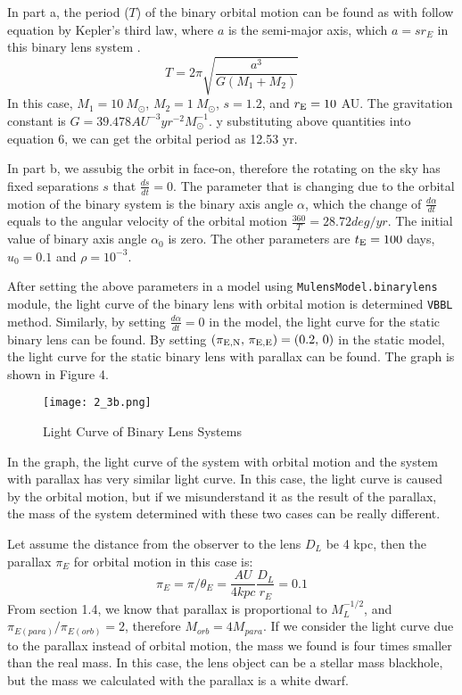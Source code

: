 \documentclass[preprint]{aastex63}
\begin{document}
In part a, the period ($T$) of the binary orbital motion can be found as with follow equation by Kepler's third law, where $a$ is the semi-major axis, which $a=sr_E$ in this binary lens system \cite{Carroll2007_2}.
\begin{equation}
   T = 2\pi\sqrt{\frac{a^3}{G (M_1 + M_2)}}
\end{equation}
In this case, $M_1=10~M_\odot$, $M_2=1~M_\odot$, $s=1.2$, and $r_{\rm E}=10$ AU. The gravitation constant is $G=39.478 AU^{-3}yr^{-2}M_\odot^{-1}$. y substituting above quantities into equation 6, we can get the orbital period as 12.53 yr.\par
\bigskip
In part b, we assubig the orbit in face-on, therefore the rotating on the sky has fixed separations $s$ that $\frac{ds}{dt}=0$. The parameter that is changing due to the orbital motion of the binary system is the binary axis angle $\alpha$, which the change of $\frac{d\alpha}{dt}$ equals to the angular velocity of the orbital motion $\frac{360}{T}=28.72 deg/yr$. The initial value of binary axis angle $\alpha_0$ is zero. The other parameters are $t_{\rm E}=100$ days, $u_0=0.1$ and $\rho=10^{-3}$. \par
After setting the above parameters in a model using \texttt{MulensModel.binarylens} module, the light curve of the binary lens with orbital motion is determined \texttt{VBBL} method. Similarly, by setting $\frac{d\alpha}{dt}=0$ in the model, the light curve for the static binary lens can be found. By setting $(\pi_{\rm E,N},\,\pi_{\rm E,E})=(0.2,\,0)$ in the static model, the light curve for the static binary lens with parallax can be found. The graph is shown in Figure 4.\par
\begin{figure}[h]
\centering
\texttt{[image: 2\_3b.png]}
\caption{Light Curve of Binary Lens Systems}
\label{fig 4}
\end{figure}
In the graph, the light curve of the system with orbital motion and the system with parallax has very similar light curve. In this case, the light curve is caused by the orbital motion, but if we misunderstand it as the result of the parallax, the mass of the system determined with these two cases can be really different.\par
Let assume the distance from the observer to the lens $D_L$ be 4 kpc, then the parallax $\pi_E$ for orbital motion in this case is:$$\pi_E=\pi/\theta_E=\frac{AU}{4kpc}\frac{D_L}{r_E}=0.1$$
From section 1.4, we know that parallax is proportional to $M_L^{-1/2}$, and $\pi_{E(para)}/\pi_{E(orb)}=2$, therefore $M_{orb}=4M_{para}$. If we consider the light curve due to the parallax instead of orbital motion, the mass we found is four times smaller than the real mass. In this case, the lens object can be a stellar mass blackhole, but the mass we calculated with the parallax is a white dwarf.\par
\end{document}
